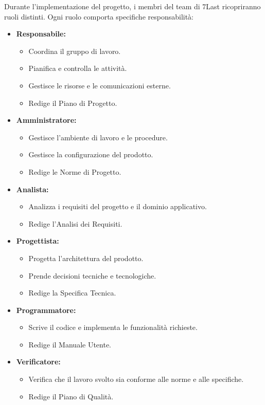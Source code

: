 Durante l'implementazione del progetto, i membri del team di 7Last ricopriranno ruoli distinti. Ogni ruolo comporta specifiche responsabilità:
\begin{itemize}
    \item \textbf{Responsabile:}
    \begin{itemize}
        \item Coordina il gruppo di lavoro.
        \item Pianifica e controlla le attività.
        \item Gestisce le risorse e le comunicazioni esterne.
        \item Redige il Piano di Progetto.
    \end{itemize}
    \item \textbf{Amministratore:}
    \begin{itemize}
        \item Gestisce l’ambiente di lavoro e le procedure.
        \item Gestisce la configurazione del prodotto.
        \item Redige le Norme di Progetto.
    \end{itemize}
    \item \textbf{Analista:}
    \begin{itemize}
        \item Analizza i requisiti del progetto e il dominio applicativo.
        \item Redige l’Analisi dei Requisiti.
    \end{itemize}
    \item \textbf{Progettista:}
    \begin{itemize}
        \item Progetta l’architettura del prodotto.
        \item Prende decisioni tecniche e tecnologiche.
        \item Redige la Specifica Tecnica.
    \end{itemize}
    \item \textbf{Programmatore:}
    \begin{itemize}
        \item Scrive il codice e implementa le funzionalità richieste.
        \item Redige il Manuale Utente.
    \end{itemize}
    \item \textbf{Verificatore:}
    \begin{itemize}
        \item Verifica che il lavoro svolto sia conforme alle norme e alle specifiche.
        \item Redige il Piano di Qualità.
    \end{itemize}
\end{itemize}

